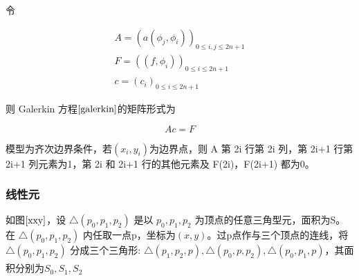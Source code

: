 \documentclass[a4paper,UTF8,titlepage]{ctexart}
\begin{document}
令

$$
\begin{matrix}
	A = (a(\phi_j, \phi_i))_{0 \le i,j \le 2n+1} \\
	F = ((f,\phi_i))_{0 \le i \le 2n+1} \\
	c = (c_i)_{0 \le i \le 2n+1}
\end{matrix}
$$

则 Galerkin 方程$\eqref{galerkin}$的矩阵形式为

\begin{equation}
	Ac = F
\end{equation}

模型为齐次边界条件，若$(x_i,y_i)$为边界点，则 A 第 2i 行第 2i 列，第 2i+1 行第 2i+1 列元素为1，第 2i 和 2i+1 行的其他元素及  F(2i)，F(2i+1) 都为0。

\subsubsection{线性元}

如图$\ref{xxy}$，设 $ \bigtriangleup(p_0,p_1,p_2) $ 是以 $p_0,p_1,p_2$ 为顶点的任意三角型元，面积为S。在 $ \bigtriangleup (p_0,p_1,p_2) $ 内任取一点p，坐标为$(x,y)$。过p点作与三个顶点的连线，将 $ \bigtriangleup(p_0,p_1,p_2) $ 分成三个三角形: $ \bigtriangleup(p_1,p_2,p), \bigtriangleup(p_0,p,p_2), \bigtriangleup(p_0,p_1,p) $，其面积分别为$S_0,S_1,S_2$ \textsuperscript{\cite{李荣华2007偏微分方程数值解}}


\begin{figure}[h]
	\centering
	\caption{}
	\label{xxy}
\end{figure}
\end{document}

